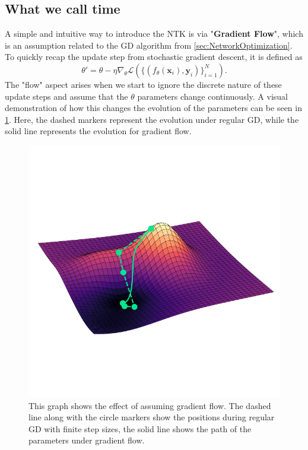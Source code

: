 \subsection{What we call time}
A simple and intuitive way to introduce the NTK is via "\textbf{Gradient Flow}", which is an assumption related to the GD algorithm from \cref{sec:NetworkOptimization}. To quickly recap the update step from stochastic gradient descent, it is defined as 
\begin{equation}
	\theta' = \theta - \eta \nabla_\theta \mathscr{L}\left( \{(f_\theta(\mathbf{x}_i), \mathbf{y}_i)\}_{i=1}^{N} \right).
\end{equation}
The "flow" aspect arises when we start to ignore the discrete nature of these update steps and assume that the $\theta$ parameters change continuously. A visual demonstration of how this changes the evolution of the parameters can be seen in \cref{fig:GradientFlowPlot}. Here, the dashed markers represent the evolution under regular GD, while the solid line represents the evolution for gradient flow.
\begin{figure}
	\centering
	\includegraphics[width=12cm, clip, trim = 0cm 2.3cm 0cm 3.5cm]{text/NTK/GradientFlowPlot.pdf}
	\caption{This graph shows the effect of assuming gradient flow. The dashed line along with the circle markers show the positions during regular GD with finite step sizes, the solid line shows the path of the parameters under gradient flow.}
	\label{fig:GradientFlowPlot}
\end{figure}
